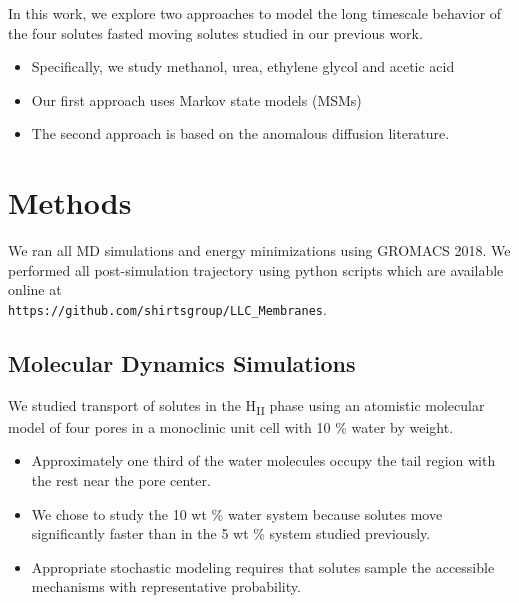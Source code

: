 \documentclass{article}
\begin{document}
  In this work, we explore two approaches to model the long timescale behavior
  of the four solutes fasted moving solutes studied in our previous work.
  \begin{itemize}
    \item Specifically, we study methanol, urea, ethylene glycol and acetic acid
  	\item Our first approach uses Markov state models (MSMs) 
  	\item The second approach is based on the anomalous diffusion literature.
  \end{itemize}

  \section{Methods}
    
  We ran all MD simulations and energy minimizations using GROMACS 2018. We  %
  performed all post-simulation trajectory using python scripts which are available
  online at \\ \texttt{https://github.com/shirtsgroup/LLC\_Membranes}.

  \subsection{Molecular Dynamics Simulations}

  We studied transport of solutes in the H\textsubscript{II} phase using an
  atomistic molecular model of four pores in a monoclinic unit cell with 
  10 \% water by weight. 
  \begin{itemize}
    \item Approximately one third of the water molecules occupy the tail region 
    with the rest near the pore center.
    \item We chose to study the 10 wt \% water system because solutes move 
    significantly faster than in the 5 wt \% system studied previously.
    \item Appropriate stochastic modeling requires that solutes sample the 
    accessible mechanisms with representative probability.  %
  \end{itemize}
  
\end{document}
